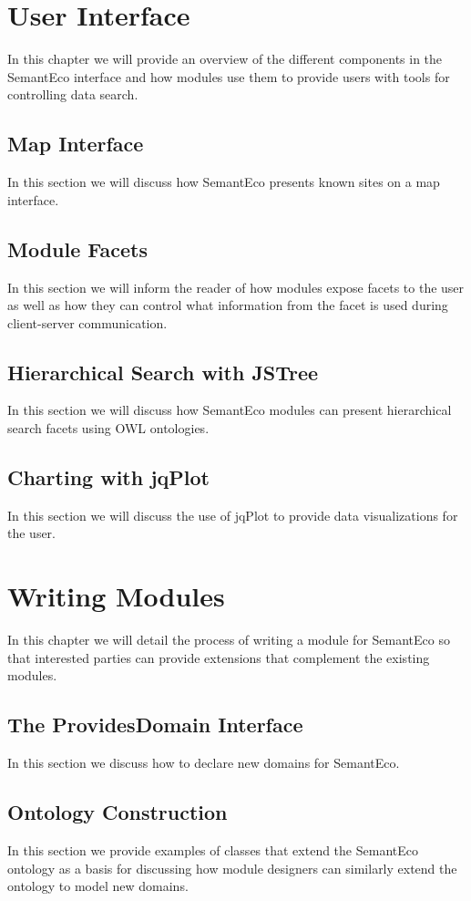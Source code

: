 \documentclass[letterpaper]{report}
\begin{document}
\chapter{User Interface}
\label{user-interface}
In this chapter we will provide an overview of the different components in the SemantEco interface and how modules use them to provide users with tools for controlling data search.
\section{Map Interface}
\label{maps}
In this section we will discuss how SemantEco presents known sites on a map interface.
\section{Module Facets}
\label{facets}
In this section we will inform the reader of how modules expose facets to the user as well as how they can control what information from the facet is used during client-server communication.
\section{Hierarchical Search with JSTree}
\label{hierarchical-search}
In this section we will discuss how SemantEco modules can present hierarchical search facets using OWL ontologies.
\section{Charting with jqPlot}
\label{visualization}
In this section we will discuss the use of jqPlot to provide data visualizations for the user.
\chapter{Writing Modules}
\label{writing-modules}
In this chapter we will detail the process of writing a module for SemantEco so that interested parties can provide extensions that complement the existing modules.
\section{The ProvidesDomain Interface}
In this section we discuss how to declare new domains for SemantEco.
\section{Ontology Construction}
In this section we provide examples of classes that extend the SemantEco ontology as a basis for discussing how module designers can similarly extend the ontology to model new domains.
\end{document}
